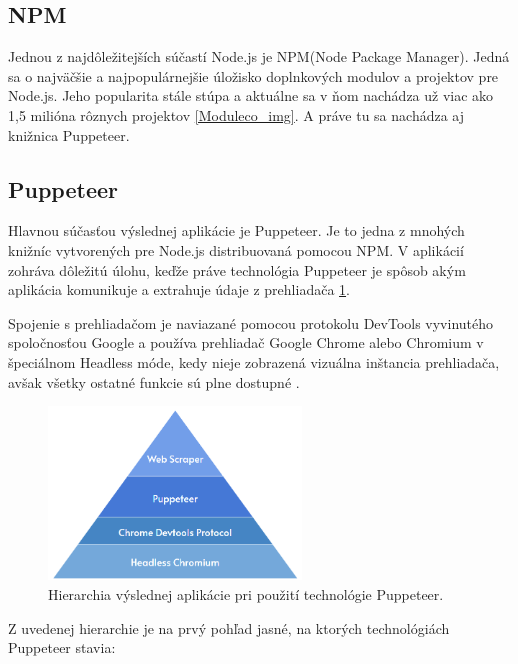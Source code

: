 \subsection{NPM}

Jednou z najdôležitejších súčastí Node.js je NPM(Node Package Manager). Jedná sa o najväčšie a najpopulárnejšie úložisko doplnkových modulov a projektov pre Node.js. Jeho popularita stále stúpa a aktuálne sa v ňom nachádza už viac ako 1,5 milióna rôznych projektov \ref{Moduleco_img}\cite{npm}. A práve tu sa nachádza aj knižnica Puppeteer.

\newpage
\subsection{Puppeteer}

Hlavnou súčasťou výslednej aplikácie je Puppeteer. Je to jedna z mnohých knižníc vytvorených pre Node.js distribuovaná pomocou NPM. V aplikácií zohráva dôležitú úlohu, keďže práve technológia Puppeteer je spôsob akým aplikácia komunikuje a extrahuje údaje z prehliadača \ref{pupepyramid_img}. 

Spojenie s prehliadačom je naviazané pomocou protokolu DevTools vyvinutého spoločnosťou Google a používa prehliadač Google Chrome alebo Chromium v špeciálnom Headless móde, kedy nieje zobrazená vizuálna inštancia prehliadača, avšak všetky ostatné funkcie sú plne dostupné \cite{puppeteer}.  

\bigskip

\begin{figure}[hbt]
	\centering
	\includegraphics[width=0.6\textwidth]{obrazky-figures/pyramid.png}
	\caption{Hierarchia výslednej aplikácie pri použití technológie Puppeteer.}
	\label{pupepyramid_img}
\end{figure}

\bigskip

Z uvedenej hierarchie je na prvý pohľad jasné, na ktorých technológiách Puppeteer stavia:

